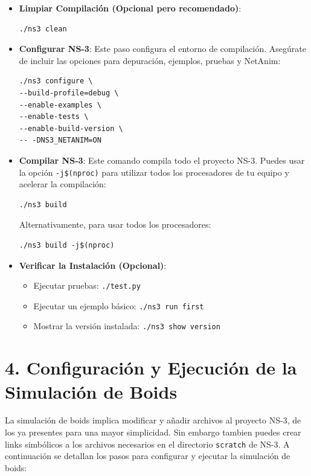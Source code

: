 \documentclass{article}
\begin{document}
\begin{itemize}
    \item \textbf{Limpiar Compilación (Opcional pero recomendado)}:
    \begin{lstlisting}
./ns3 clean
    \end{lstlisting}
    \item \textbf{Configurar NS-3}: Este paso configura el entorno de compilación. Asegúrate de incluir las opciones para depuración, ejemplos, pruebas y NetAnim:
    \begin{lstlisting}
./ns3 configure \
--build-profile=debug \
--enable-examples \
--enable-tests \
--enable-build-version \
-- -DNS3_NETANIM=ON
    \end{lstlisting}
    \item \textbf{Compilar NS-3}: Este comando compila todo el proyecto NS-3. Puedes usar la opción \texttt{-j\$(nproc)} para utilizar todos los procesadores de tu equipo y acelerar la compilación:
    \begin{lstlisting}
./ns3 build
    \end{lstlisting}
    Alternativamente, para usar todos los procesadores:
    \begin{lstlisting}
./ns3 build -j$(nproc)
    \end{lstlisting}
    \item \textbf{Verificar la Instalación (Opcional)}:
    \begin{itemize}
        \item Ejecutar pruebas: \texttt{./test.py}
        \item Ejecutar un ejemplo básico: \texttt{./ns3 run first}
        \item Mostrar la versión instalada: \texttt{./ns3 show version}
    \end{itemize}
\end{itemize}

\section*{\textbf{4. Configuración y Ejecución de la Simulación de Boids}}

La simulación de boids implica modificar y añadir archivos al proyecto NS-3, de los ya presentes para una mayor simplicidad. Sin embargo tambien puedes crear links simbólicos a los archivos necesarios en el directorio \texttt{scratch} de NS-3. A continuación se detallan los pasos para configurar y ejecutar la simulación de boids:
\end{document}
